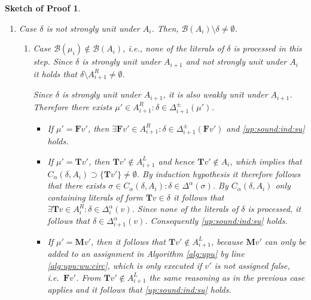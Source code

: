 \documentclass[final]{vutinfth} %
\newtheorem{proof-sketch}{Sketch of Proof}[chapter]
\newcommand{\bass}{\mathcal{B}}
\newcommand{\bpro}{\mathcal{B}}
\newcommand{\ass}{A}
\newcommand{\bT}{\mathbf{T}}
\newcommand{\bM}{\mathbf{M}}
\newcommand{\bF}{\mathbf{F}}
\newcommand{\cdal}{C_\alpha}
\newcommand{\dpm}{\Delta^\pm}
\newcommand{\dal}{\Delta^\alpha}
\newcommand{\sgl}{\mu}
\newcommand{\bsgl}{\sigma}
\begin{document}
\begin{proof-sketch}
\begin{enumerate}
\begin{enumerate}
\begin{enumerate}
		From $\ass_{i}^R \setminus \{ \sgl_i \} \subseteq \ass_{i+1}^R$, it follows that if ${\bT v_1}, {\bF v_2}$ exist, they are in $\ass_{i+1}^R$. Also, $\delta \in \dal_i(v_1)$ implies $\delta \in \dal_{i+1}(v_1)$ and $\delta \in \dpm_i({\bF v_2})$ implies $\delta \in \dpm_{i+1}({\bF v_2})$ because $\delta$ is strongly unit and $\bpro(\sgl_i) \not \in \delta$, i.e. no algorithm will change the watches that contain $\delta$. So we have $\exists {\bT v_1} \in \ass_{i+1}^R : \delta \in \dal_{i+1}(v_1)$ or $\exists {\bF v_2} \in \ass_{i+1}^R : \delta \in \dpm_{i+1}({\bF v_2})$, i.e.~\ref{up:sound:ind:su}. %
	\end{enumerate}
	
	
	\item Case $\delta$ is not strongly unit under $A_i$. Then, $\bass(\ass_i) \setminus \delta \not = \emptyset$.


	\begin{enumerate}
		\item Case $\bpro(\sgl_i) \not \in \bass(A_i)$, i.e., none of the literals of $\delta$ is processed in this step. Since $\delta$ is strongly unit under $\ass_{i+1}$ and not strongly unit under $A_i$ it holds that $\delta \setminus \ass_{i+1}^R \not = \emptyset$.
		
		Since $\delta$ is strongly unit under $\ass_{i+1}$, it is also weakly unit under $\ass_{i+1}$. Therefore there exists $\sgl' \in \ass_{i+1}^R : \delta \in \dpm_{i+1}(\sgl')$.
		
		\begin{itemize}
			\item If $\sgl' = \bF v'$, then $\exists \bF v' \in \ass_{i+1}^R : \delta \in \dpm_{i+1}(\bF v')$ and \ref{up:sound:ind:su} holds.
			\item If $\sgl' = \bT v'$, then $\bT v' \not \in \ass_{i+1}^L$ and hence $\bT v' \not \in \ass_i$, which implies that $\cdal(\delta, \ass_i) \supset \{ \bT v' \} \not = \emptyset$. By induction hypothesis it therefore follows that there exists $\bsgl \in \cdal(\delta, \ass_i) : \delta \in \dal(\bsgl)$. By $\cdal(\delta, \ass_i)$ only containing literals of form $\bT v \in \delta$ it follows that $\exists \bT v \in \ass_i^R : \delta \in \dal_i(v)$. Since none of the literals of $\delta$ is processed, it follows that $\delta \in \dal_{i+1}(v)$. Consequently \ref{up:sound:ind:su} holds.
			\item If $\sgl' = \bM v'$, then it follows that $\bT v' \not \in \ass_{i+1}^L$, because $\bM v'$ can only be added to an assignment in Algorithm \ref{alg:upu} by line \ref{alg:upu:wu:circ}, which is only executed if $v'$ is not assigned false, i.e.~$\bF v'$. From $\bT v' \not \in \ass_{i+1}^L$ the same reasoning as in the previous case applies and it follows that \ref{up:sound:ind:su} holds.
		\end{itemize}
	

\end{enumerate}
\end{enumerate}
\end{enumerate}
\end{proof-sketch}
\end{document}
